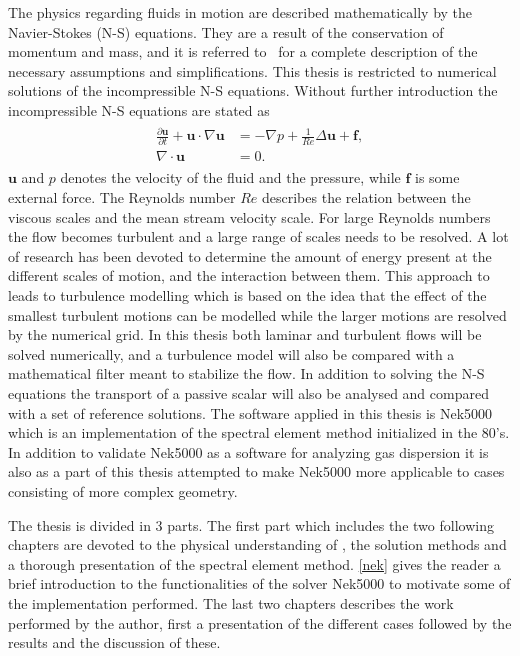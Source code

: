 The physics regarding fluids in motion are described mathematically by the Navier-Stokes (N-S) equations. 
They are a result of the conservation of momentum and mass, and it is referred to~\cite{White} for a complete 
description of the necessary assumptions and simplifications. 
This thesis is restricted to numerical solutions of the incompressible N-S equations.
Without further introduction the incompressible N-S equations are stated as  
%
\begin{align}
    \begin{split}
    \frac{\partial \mathbf{u}}{\partial t} + \mathbf{u}\cdot \nabla\mathbf{u} &= 
    -\nabla p + \frac{1}{Re} \Delta\mathbf{u} + \mathbf{f}, \\
		\nabla \cdot \mathbf{u} &= 0.
    \end{split}
	\label{eq:NS}
\end{align}
%
$\mathbf{u}$ and $p$ denotes the velocity of the fluid and the pressure, while $\mathbf{f}$ is some external force. 
The Reynolds number $Re$ describes the relation between the viscous scales and the mean stream velocity scale.
For large Reynolds numbers the flow becomes turbulent and a large range of scales needs to be resolved. A lot 
of research has been devoted to determine the amount of energy present at the different scales of motion, and 
the interaction between them. This approach to  leads to turbulence modelling which is based on the 
idea that the effect of the smallest turbulent motions can be modelled while the larger motions are resolved by 
the numerical grid. 
In this thesis both laminar and turbulent flows will be solved numerically, and a turbulence model will also 
be compared with a mathematical filter meant to stabilize the flow. In addition to solving the N-S equations the 
transport of a passive scalar will also be analysed and compared with a set of reference solutions. 
The software applied in this thesis is Nek5000 which is an implementation of the spectral element method initialized in the 80's.
In addition to validate Nek5000 as a software for analyzing gas dispersion it is also as a part of this thesis 
attempted to make Nek5000 more applicable to cases consisting of more complex geometry. 

The thesis is divided in 3 parts. The first part which includes the two following chapters are devoted to the physical understanding 
of , the solution methods and a thorough presentation of the spectral element method. \cref{nek} gives the reader a brief 
introduction to the functionalities of the solver Nek5000 to motivate some of the implementation performed. The last two chapters 
describes the work performed by the author, first a presentation of the different cases followed by the results and the discussion
of these.

